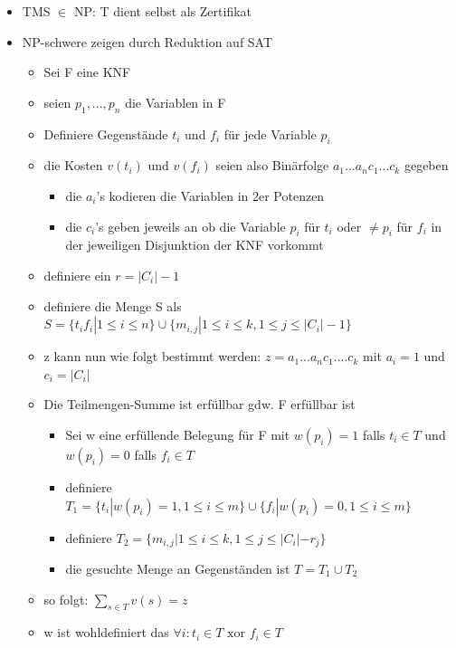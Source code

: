\documentclass[12pt,a4paper]{article}
\begin{document}
\begin{itemize}
\item TMS $\in$ NP: T dient selbst als Zertifikat
\item NP-schwere zeigen durch Reduktion auf SAT
\begin{itemize}
\item Sei F eine KNF
\item seien $p_1, ..., p_n$ die Variablen in F
\item Definiere Gegenstände $t_i$ und $f_i$ für jede Variable $p_i$
\item die Kosten $v(t_i)$ und $v(f_i)$ seien also Binärfolge $a_1...a_n c_1...c_k$ gegeben
\begin{itemize}
\item die $a_i$'s kodieren die Variablen in 2er Potenzen
\item die $c_i$'s geben jeweils an ob die Variable $p_i$ für $t_i$ oder $\neq p_i$ für $f_i$ in der jeweiligen Disjunktion der KNF vorkommt
\end{itemize}
\item definiere ein $r = |C_i| - 1$
\item definiere die Menge S als $S = \{t_i f_i | 1 \leq i \leq n \} \cup \{m_{i,j} | 1 \leq i \leq k, 1 \leq j \leq |C_i| -1 \}$
\item z kann nun wie folgt bestimmt werden: $z=a_1...a_n c_1....c_k$ mit $a_i = 1$ und $c_i = |C_i|$
\item Die Teilmengen-Summe ist erfüllbar gdw. F erfüllbar ist
\begin{itemize}
\item Sei w eine erfüllende Belegung für F mit $w(p_i) = 1$ falls $t_i \in T$ und $w(p_i) = 0$ falls $f_i \in T$
\item definiere $T_1 = \{t_i | w(p_i) = 1, 1 \leq i \leq m \} \cup \{f_i | w(p_i) = 0, 1 \leq i \leq m \}$
\item definiere $T_2 = \{m_{i,j} | 1 \leq i \leq k, 1 \leq j \leq |C_i| - r_j \}$
\item die gesuchte Menge an Gegenständen ist $T = T_1 \cup T_2$
\end{itemize}
\item so folgt: $\sum_{s\in T} v(s) = z$
\item w ist wohldefiniert das $\forall i : t_i \in T \text{ xor } f_i \in T$
\end{itemize}
\end{itemize}
\end{document}
